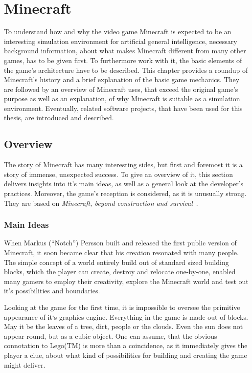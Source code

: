\chapter{Minecraft}
To understand how and why the video game Minecraft is expected to be an interesting simulation environment for artificial general intelligence, necessary background information, about what makes Minecraft different from many other games, has to be given first. To furthermore work with it, the basic elements of the game's architecture have to be described. This chapter provides a roundup of Minecraft's history and a brief explanation of the basic game mechanics. They are followed by an overview of Minecraft uses, that exceed the original game's purpose as well as an explanation, of why Minecraft is suitable as a simulation environment. Eventually, related software projects, that have been used for this thesis, are introduced and described.

    \section{Overview}
The story of Minecraft has many interesting sides, but first and foremost it is a story of immense, unexpected success. To give an overview of it, this section delivers insights into it's main ideas, as well as a general look at the developer's practices. Moreover, the game's reception is considered, as it is unusually strong. They are based on \emph{Minecraft, beyond construction and survival}~\cite{Duncan:2011:MBC:2207096.2207097}.
    
        \subsection{Main Ideas}
When Markus (``Notch'') Persson built and released the first public version of Minecraft, it soon became clear that his creation resonated with many people. The simple concept of a world entirely build out of standard sized building blocks, which the player can create, destroy and relocate one-by-one, enabled many gamers to employ their creativity, explore the Minecraft world and test out it's possibilities and boundaries.

Looking at the game for the first time, it is impossible to oversee the primitive appearance of it`s graphics engine. Everything in the game is made out of blocks. May it be the leaves of a tree, dirt, people or the clouds. Even the sun does not appear round, but as a cubic object. One can assume, that the obvious connotation to Lego(TM) is more than a coincidence, as it immediately gives the player a clue, about what kind of possibilities for building and creating the game might deliver.

